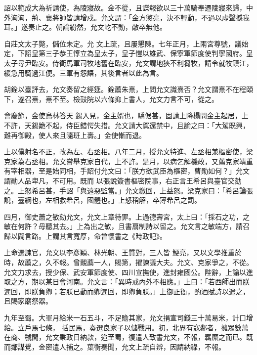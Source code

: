 \begin{pinyinscope}
 詔以範成大為祈請使，為陵寢故。金不從，且諜報欲以三十萬騎奉遷陵寢來歸，中外洶洶，荊、襄將帥皆請增戍。允文謂：「金方懲亮，決不輕動，不過以虛聲撼我耳。」遂奏止之。朝論紛然，允文屹不動，敵卒無他。



 自莊文太子斃，儲位未定。允
 文上疏，且屢懇陳。七年正月，上兩宮尊號，議始定，下詔皇第三子恭王惇立為皇太子，皇子愷以雄武、保寧軍節度使判寧國府。皇太子尋尹臨安。侍衛馬軍司牧地舊在臨安，允文謂地狹不利芻牧，請令就牧鎮江，緩急用騎過江便。三軍有怨語，其後言者以此為言。



 胡銓以臺評去，允文奏留之經筵。銓薦朱熹，上問允文識熹否？允文謂熹不在程頤下，遂召熹，熹不至。檢鼓院以六條抑上書人，允文力言不可，從之。



 會慶節，金使烏林答天
 錫入見，金主婿也，驕倨甚，固請上降榻問金主起居，上不許，天錫跪不起，侍臣錯愕失措。允文請大駕還禁中，且諭之曰：「大駕既興，難再御殿，使人來且隨班上壽。」金使慚而退。



 上以僕射名不正，改為左、右丞相。八年二月，授允文特進、左丞相兼樞密使，梁克家為右丞相。允文嘗舉克家自代，上不許。是月，以病乞解機政，又薦克家靖重有宰相器，至是始同相，手詔付允文曰：「朕方欲武臣為樞密，曹勛如何？」允文謂勛人品卑凡，不可用。既而
 以張說簽書樞密院事，右正言王希呂與臺官交劾之。上怒希呂甚，手詔「與遠惡監當。」允文繳回，上益怒。梁克家曰：「希呂論張說，臺綱也，左相救希呂，國體也。」上怒稍解，卒薄希呂之罰。



 四月，御史蕭之敏劾允文，允文上章待罪。上過德壽宮，太上曰：「採石之功，之敏在何許？毋聽其去。」上為出之敏，且書扇制詩以留之。允文言之敏端方，請召歸以闢言路。上謂其言寬厚，命曾懷書之《時政記》。



 上命選諫官，允文以李彥穎、林光朝、王質對，三人皆
 鯁亮，又以文學推重於時，故薦之，久不報。曾覿薦一人，賜第，擢諫議大夫。允文、克家爭之，不從。允文力求去，授少保、武安軍節度使、四川宣撫使，進封雍國公。陛辭，上諭以進取之方，期以某日會河南。允文言：「異時戒內外不相應。」上曰：「若西師出而朕遲回，即朕負卿；若朕已動而卿遲回，即卿負朕。」上御正衙，酌酒賦詩以遣之，且賜家廟祭器。



 九年至蜀。大軍月給米一石五斗，不足贍其家，允文捐宣司錢三十萬易米，計口增給。立戶馬七條，
 括民馬，奏選良家子以儲戰用。初，北界有寇鄰者，擁眾數萬在商、虢間，允文秉政日納款，迨至蜀，復遣人致書允文，不報，羈縻之而已。既而鄰謀覺，金密遣人捕之。葉衡奏聞，允文上疏自辨，因請納祿，不報。




\end{pinyinscope}
